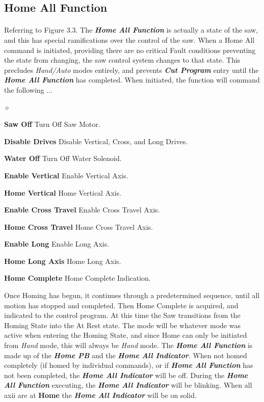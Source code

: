 \subsection{Home All Function}\paragraph*{}Referring to Figure 3.3. The \textbf{\textit{Home All Function}} is actually a state of the saw, and this has special ramifications over the control of the saw. When a Home All command is initiated, providing there are no critical Fault conditions preventing the state from changing, the saw control system changes to that state. This precludes \textit{Hand/Auto} modes entirely, and prevents \textit{\textbf{Cut Program}} entry until the \textit{\textbf{Home All Function}} has completed. When initiated, the function will command the following ...
\begin{list}{$\diamond$}{}
	\item \textbf{Saw Off} Turn Off Saw Motor.
	\item \textbf{Disable Drives} Disable Vertical, Cross, and Long Drives.
	\item \textbf{Water Off} Turn Off Water Solenoid.
	\item \textbf{Enable Vertical} Enable Vertical Axis.
	\item \textbf{Home Vertical} Home Vertical Axis.
	\item \textbf{Enable Cross Travel} Enable Cross Travel Axis.
	\item \textbf{Home Cross Travel} Home Cross Travel Axis.
	\item \textbf{Enable Long} Enable Long Axis.
	\item \textbf{Home Long Axis} Home Long Axis.
	\item \textbf{Home Complete} Home Complete Indication.
\end{list}
Once Homing has begun, it continues through a predetermined sequence, until all motion has stopped and completed. Then Home Complete is acquired, and indicated to the control program. At this time the Saw transitions from the Homing State into the At Rest state. The mode will be whatever mode was active when entering the Homing State, and since Home can only be initiated from \textit{Hand} mode, this will always be \textit{Hand} mode. The \textbf{\textit{Home All Function}} is made up of the \textbf{\textit{Home PB}} and the \textbf{\textit{Home All Indicator}}. When not homed completely (if homed by individual commands), or if \textbf{\textit{Home All Function}} has not been completed, the \textbf{\textit{Home All Indicator}} will be off. During the \textbf{\textit{Home All Function}} executing, the \textbf{\textit{Home All Indicator}} will be blinking. When all axii are at \textbf{Home} the \textbf{\textit{Home All Indicator}} will be on solid.
